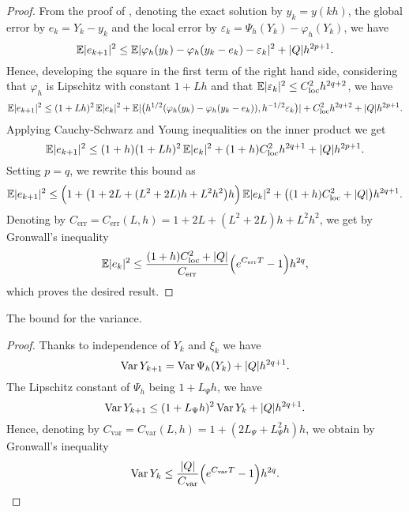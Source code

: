 \documentclass{siamart1116}
\numberwithin{theorem}{section}
\DeclarePairedDelimiter{\abs}{\lvert}{\rvert}
\renewcommand{\phi}{\varphi}
\newcommand{\epl}{\varepsilon}
\newcommand{\Var}{\operatorname{Var}}
\newcommand{\E}{\operatorname{\mathbb{E}}}
\begin{document}
\begin{proof} From the proof of \cite[Theorem 2.2]{CGS16}, denoting the exact solution by $y_k = y(kh)$, the global error by $e_k = Y_k - y_k$ and the local error by $\epl_k = \Psi_h(Y_k) - \phi_h(Y_k)$, we have
	\begin{equation*}
		\E\abs{e_{k+1}}^2 \leq \E\abs{\phi_h(y_k) - \phi_h(y_k - e_k) - \epl_k}^2 + \abs{Q}h^{2p+1}.
	\end{equation*}
	Hence, developing the square in the first term of the right hand side, considering that $\phi_h$ is Lipschitz with constant $1 + Lh$ and that $\E\abs{\epl_k}^2 \leq C_{\mathrm{loc}}^2 h^{2q + 2}$, we have
	\begin{equation*}
		\E\abs{e_{k+1}}^2 \leq (1 + Lh)^2 \E \abs{e_k}^2 + \E\abs{\big(h^{1/2}(\phi_h(y_k) - \phi_h(y_k - e_k)), h^{-1/2}\epl_k\big)} + C_{\mathrm{loc}}^2 h^{2q + 2} + \abs{Q}h^{2p+1}.
	\end{equation*}
	Applying Cauchy-Schwarz and Young inequalities on the inner product we get
	\begin{equation*}
		\E\abs{e_{k+1}}^2 \leq (1 + h)(1 + Lh)^2 \E \abs{e_k}^2 + (1 + h)C_{\mathrm{loc}}^2 h^{2q + 1} + \abs{Q}h^{2p+1}.
	\end{equation*}
	Setting $p = q$, we rewrite this bound as
	\begin{equation*}
		\E\abs{e_{k+1}}^2 \leq \Big(1 + \big(1 + 2L + (L^2 + 2L)h + L^2h^2\big)h\Big) \E \abs{e_k}^2 + \big((1 + h)C_{\mathrm{loc}}^2 + \abs{Q}\big)h^{2q + 1}.
	\end{equation*}
	Denoting by $C_{\mathrm{err}} = C_{\mathrm{err}}(L, h) = 1 + 2L + (L^2 + 2L)h + L^2h^2$, we get by Gronwall's inequality
	\begin{equation*}
		\E\abs{e_k}^2 \leq \frac{(1 + h)C_{\mathrm{loc}}^2 + \abs{Q}}{C_{\mathrm{err}}}\Big(e^{C_{\mathrm{err}}T} - 1\Big)h^{2q},
	\end{equation*}
	which proves the desired result.
\end{proof}

\begin{theorem}[Variance] The bound for the variance.
\end{theorem}

\begin{proof} Thanks to independence of $Y_k$ and $\xi_k$ we have
	\begin{equation*}
		\Var Y_{k+1} = \Var \Psi_h(Y_k) + \abs{Q} h^{2q+1}.
	\end{equation*}
	The Lipschitz constant of $\Psi_h$ being $1 + L_\Psi h$, we have
	\begin{equation*}
		\Var Y_{k+1} \leq (1 + L_\Psi h)^2 \Var Y_k + \abs{Q}h^{2q+1}.
	\end{equation*}
	Hence, denoting by $C_{\mathrm{var}} = C_{\mathrm{var}}(L, h) = 1 + (2L_\Psi + L_\Psi^2 h) h$, we obtain by Gronwall's inequality
	\begin{equation}
		\Var Y_k \leq \frac{\abs{Q}}{C_{\mathrm{var}}}\Big(e^{C_{\mathrm{var}}T} - 1\Big)h^{2q}.
 	\end{equation}
\end{proof}
\clearpage
\end{document}
